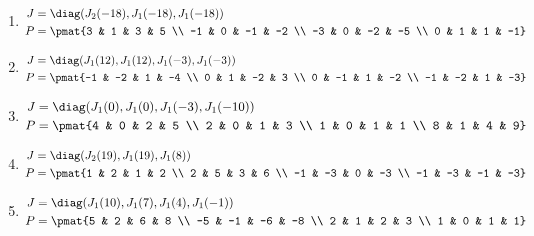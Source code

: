 \begin{enumerate}
\item

\begin{align*}
J &= \diag(J_{2}(-18), J_{1}(-18), J_{1}(-18))\\
P &= \pmat{3 & 1 & 3 & 5 \\ -1 & 0 & -1 & -2 \\ -3 & 0 & -2 & -5 \\ 0 & 1 & 1 & -1}
\end{align*}

\item

\begin{align*}
J &= \diag(J_{1}(12), J_{1}(12), J_{1}(-3), J_{1}(-3))\\
P &= \pmat{-1 & -2 & 1 & -4 \\ 0 & 1 & -2 & 3 \\ 0 & -1 & 1 & -2 \\ -1 & -2 & 1 & -3}
\end{align*}

\item

\begin{align*}
J &= \diag(J_{1}(0), J_{1}(0), J_{1}(-3), J_{1}(-10))\\
P &= \pmat{4 & 0 & 2 & 5 \\ 2 & 0 & 1 & 3 \\ 1 & 0 & 1 & 1 \\ 8 & 1 & 4 & 9}
\end{align*}

\item

\begin{align*}
J &= \diag(J_{2}(19), J_{1}(19), J_{1}(8))\\
P &= \pmat{1 & 2 & 1 & 2 \\ 2 & 5 & 3 & 6 \\ -1 & -3 & 0 & -3 \\ -1 & -3 & -1 & -3}
\end{align*}

\item

\begin{align*}
J &= \diag(J_{1}(10), J_{1}(7), J_{1}(4), J_{1}(-1))\\
P &= \pmat{5 & 2 & 6 & 8 \\ -5 & -1 & -6 & -8 \\ 2 & 1 & 2 & 3 \\ 1 & 0 & 1 & 1}
\end{align*}


\end{enumerate}
